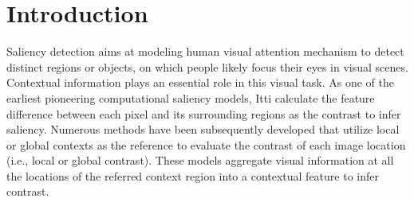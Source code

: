\documentclass[10pt,twocolumn,letterpaper]{article}
\begin{document}
\section{Introduction}

Saliency detection aims at modeling human visual attention mechanism to detect distinct regions or objects, on which people likely focus their eyes in visual scenes.
%
Contextual information plays an essential role in this visual task. As one of the earliest pioneering computational saliency models, Itti \etal \cite{itti1998model} calculate the feature difference between each pixel and its surrounding regions as the contrast to infer saliency.
%
 Numerous methods have been subsequently developed \cite{han2011bottom,cheng2015global,klein2011center} that utilize local or global contexts as the reference to evaluate the contrast of each image location (i.e., local or global contrast).
 These models aggregate visual information at all the locations of the referred context region into a contextual feature to infer contrast.
\end{document}
